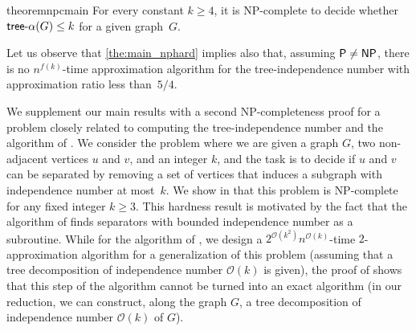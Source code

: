 \documentclass[11pt]{article}
\theoremstyle{definition}
\newcommand{\tin}{\mathsf{tree} \textnormal{-} \alpha}
\renewcommand{\P}{\textup{\textsf{P}}}
\newcommand{\NP}{\textup{\textsf{NP}}}
\newcommand{\OO}{\mathcal{O}}
\begin{document}
\begin{restatable}{theorem}{npcmain}
\label{the:main_nphard}
For every constant $k\geq 4$, it is \NP-complete to decide whether $\tin(G)\leq k$ for a given graph~$G$.
\end{restatable}


 Let us observe that  \cref{the:main_nphard} implies also that, assuming $\P \neq \NP$, there is no $n^{f(k)}$-time approximation algorithm for the tree-independence number with approximation ratio less than~$5/4$.

We supplement our main results with a second \NP-completeness proof for a problem closely related to computing the tree-independence number and the algorithm of .
We consider the problem where we are given a graph $G$, two non-adjacent vertices $u$ and $v$, and an integer $k$, and the task is to decide if $u$ and $v$ can be separated by removing a set of vertices that induces a subgraph with independence number at most~$k$.
We show in  that this problem is \NP-complete for any fixed integer $k \ge 3$.
This hardness result is motivated by the fact that the algorithm of  finds separators with bounded independence number as a subroutine.
While for the algorithm of , we design a $2^{\OO(k^2)} n^{\OO(k)}$-time $2$-approximation algorithm for a generalization of this problem (assuming that a tree decomposition of independence number $\OO(k)$ is given), the proof of  shows that this step of the algorithm cannot be turned into an exact algorithm (in our reduction, we can construct, along the graph $G$, a tree decomposition of independence number $\OO(k)$ of $G$).
\end{document}
